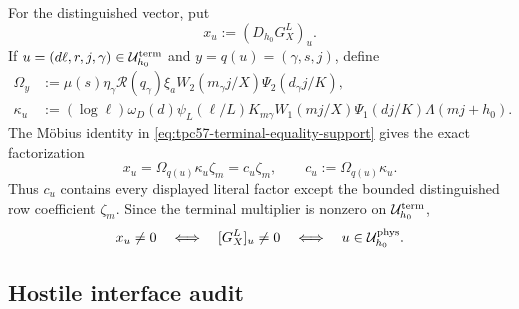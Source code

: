 For the distinguished vector, put
\begin{equation}
 x_u:=(D_{h_0}G_X^L)_u.
 \label{eq:tpc57-distinguished-terminal-amplitude}
\end{equation}
If \(u=(d\ell,r,j,\gamma)\in\mathcal U_{h_0}^{\rm term}\) and
\(y=q(u)=(\gamma,s,j)\), define
\begin{align}
 \Omega_y
 &:={}
 \mu(s)\eta_\gamma\mathscr R(q_\gamma)\xi_a
 W_2(m_\gamma j/X)\Psi_2(d_\gamma j/K),
 \label{eq:tpc57-common-output-factor}\\
 \kappa_u
 &:={}
 (\log\ell)\omega_D(d)\psi_L(\ell/L)K_{m\gamma}
 W_1(mj/X)\Psi_1(dj/K)\Lambda(mj+h_0).
 \label{eq:tpc57-row-free-terminal-factor}
\end{align}
The M\"obius identity in
\eqref{eq:tpc57-terminal-equality-support} gives the exact factorization
\begin{equation}
 \boxed{
 x_u=\Omega_{q(u)}\kappa_u\zeta_m
     =c_u\zeta_m,
 \qquad c_u:=\Omega_{q(u)}\kappa_u.}
 \label{eq:tpc57-exact-row-factorization}
\end{equation}
Thus \(c_u\) contains every displayed literal factor except the bounded
distinguished row coefficient \(\zeta_m\).  Since the terminal multiplier is
nonzero on \(\mathcal U_{h_0}^{\rm term}\),
\begin{equation}
 x_u\ne0
 \quad\Longleftrightarrow\quad
 [G_X^L]_u\ne0
 \quad\Longleftrightarrow\quad
 u\in\mathcal U_{h_0}^{\rm phys}.
 \label{eq:tpc57-active-support-equivalence}
\end{equation}

\subsection{Hostile interface audit}

